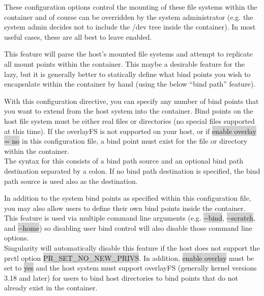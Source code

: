 \documentclass[a4paper]{article}
\newcounter{subsubsubsection}[subsubsection]
\begin{document}

These configuration options control the mounting of these file systems within the container and of course can be overridden by the system administrator (e.g. the system admin decides not to include the /dev tree inside the container). In most useful cases, these are all best to leave enabled.

This feature will parse the host’s mounted file systems and attempt to replicate all mount points within the container. This maybe a desirable feature for the lazy, but it is generally better to statically define what bind points you wish to encapsulate within the container by hand (using the below “bind path” feature).



With this configuration directive, you can specify any number of bind points that you want to extend from the host system into the container. Bind points on the host file system must be either real files or directories (no special files supported at this time). If the overlayFS is not supported on your host, or if \colorbox{lightgray}{enable overlay = no} in this configuration file, a bind point must exist for the file or directory within the container. \\[0.1in]

The syntax for this consists of a bind path source and an optional bind path destination separated by a colon. If no bind path destination is specified, the bind path source is used also as the destination.




In addition to the system bind points as specified within this configuration file, you may also allow users to define their own bind points inside the container. This feature is used via multiple command line arguments (e.g.  \colorbox{lightgray}{-{}-bind},  \colorbox{lightgray}{-{}-scratch}, and  \colorbox{lightgray}{-{}-home}) so disabling user bind control will also disable those command line options.\\[0.1in]

Singularity will automatically disable this feature if the host does not support the prctl option  \colorbox{lightgray}{PR\_SET\_NO\_NEW\_PRIVS}. In addition,  \colorbox{lightgray}{enable overlay} must be set to  \colorbox{lightgray}{yes} and the host system must support overlayFS (generally kernel versions 3.18 and later) for users to bind host directories to bind points that do not already exist in the container.
\end{document}
